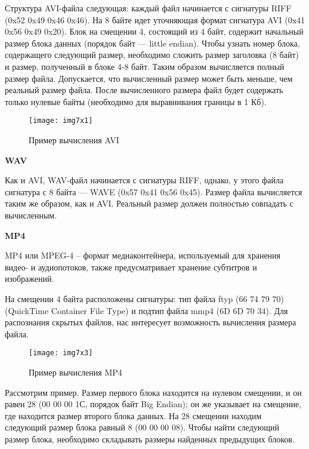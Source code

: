 Структура AVI-файла следующая: каждый файл начинается с сигнатуры RIFF (0x52
0x49 0x46 0x46). На 8 байте идет уточняющая формат сигнатура AVI (0x41 0x56
0x49 0x20). Блок на смещении 4, состоящий из 4 байт, содержит начальный
размер блока данных (порядок байт — little endian). Чтобы узнать номер блока,
содержащего следующий размер, необходимо сложить размер заголовка (8 байт) и
размер, полученный в блоке 4-8 байт. Таким образом вычисляется полный размер
файла. Допускается, что вычисленный размер может быть меньше, чем реальный
размер файла. После вычисленного размера файл будет содержать только нулевые
байты (необходимо для выравнивания границы в 1 Кб).

\begin{figure}[htbp]
  \centering
  \texttt{[image: img7x1]}
  \caption{Пример вычисления AVI}\label{img7x2}
\end{figure}

\textbf{WAV}

Как и AVI, WAV-файл начинается с сигнатуры RIFF, однако, у этого файла
сигнатура с 8 байта — WAVE (0x57 0x41 0x56 0x45). Размер файла вычисляется
таким же образом, как и AVI. Реальный размер должен полностью совпадать с
вычисленным.

 \textbf{MP4}

MP4 или MPEG-4 – формат медиаконтейнера, используемый для хранения видео- и
аудиопотоков, также предусматривает хранение субтитров и изображений.

На смещении 4 байта расположены сигнатуры: тип файла ftyp (66 74 79 70)
(QuickTime Container File Type) и подтип файла mmp4 (6D 6D 70 34). Для
распознания скрытых файлов, нас интересует возможность вычисления размера
файла.

\begin{figure}[htbp]
  \centering
  \texttt{[image: img7x3]}
  \caption{Пример вычисления MP4}\label{img:img7x3}
\end{figure}


Рассмотрим пример. Размер первого блока находится на нулевом смещении, и он
равен 28 (00 00 00 1С, порядок байт Big Endian); он же указывает на смещение,
где находится размер второго блока данных. На 28 смещении находим следующий
размер блока равный 8 (00 00 00 08). Чтобы найти следующий размер блока,
необходимо складывать размеры найденных предыдущих блоков.

